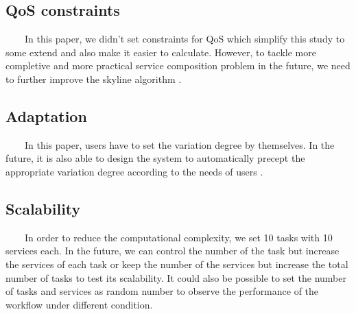 \documentclass[senior,final,11pt]{iscs-thesis}
\begin{document}
\subsection{QoS constraints}
~~~~In this paper, we didn't set constraints for QoS which simplify this study to some extend and also make it easier to calculate. However, to tackle more completive and more practical service composition problem in the future, we need to further improve the skyline algorithm\cite{16} \cite{17} \cite{18}\cite{19} \cite{20}.
\subsection{Adaptation}
~~~~In this paper, users have to set the variation degree by themselves. In the future, it is also able to design the system to automatically precept the appropriate variation degree according to the needs of users \cite{21}.
\subsection{Scalability}
~~~~In order to reduce the computational complexity, we set 10 tasks with 10 services each. In the future, we can control the number of the task but increase the services of each task or keep the number of the services but increase the total number of tasks to test its scalability. It could also be possible to set the number of tasks and services as random number to observe the performance of the workflow under different condition.
\end{document}
